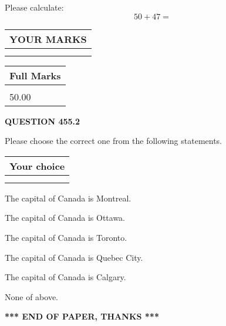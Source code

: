 \documentclass[12pt]{article}
\begin{document}
  
 
Please calculate:
\begin{equation}
50 +  %
47 = \nonumber
\end{equation}
 

 

 
  
\vspace{0.2in}
  
\noindent\begin{tabular}{|l|}
\hline
 YOUR MARKS  \\
\hline
 \\ 
 \\ 
\hline
\end{tabular}
\hspace{0.05in} \begin{tabular}{|l|}
\hline
 Full Marks  \\
\hline
 \\ 
50.00 \\
\hline
\end{tabular}
{\textbf{\Large{QUESTION
455.2 
}}}
  
  
Please choose the correct one from the following statements.
  
  
\noindent\hspace{3.0in} \begin{tabular}{|l|}
\hline
Your choice \\
\hline
 \\ 
 \\ 
\hline
\end{tabular}
  
  
 
 
The capital of Canada is Montreal.
 
 
The capital of Canada is Ottawa.
 
 
The capital of Canada is Toronto.
 
 
The capital of Canada is Quebec City.
 
 
The capital of Canada is Calgary.
 
 
 None of above.
 
 
   
   
 \vspace{0.2in}
 
   
   
   
   
\vspace{1.0in} 
{\textbf{\large{ *** END OF PAPER, THANKS *** }}} 
   
\end{document}
